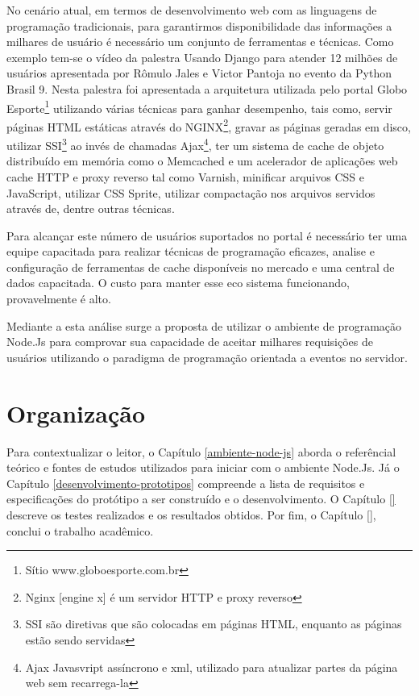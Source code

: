   No cenário atual, em termos de desenvolvimento web com as linguagens de programação tradicionais, 
  para garantirmos disponibilidade das informações a milhares de usuário é necessário um conjunto 
  de ferramentas e técnicas. Como exemplo tem-se o vídeo da palestra Usando Django para atender 12 milhões de usuários 
  apresentada por Rômulo Jales e Victor Pantoja no evento da Python Brasil 9.
  Nesta palestra foi apresentada a arquitetura utilizada pelo portal 
  Globo Esporte\footnote{Sítio www.globoesporte.com.br} utilizando várias técnicas 
  para ganhar desempenho, tais como, servir páginas HTML estáticas através do 
  NGINX\footnote{Nginx [engine x] é um servidor HTTP e proxy reverso}, gravar as páginas geradas em 
  disco, utilizar 
  SSI\footnote{SSI são diretivas que são colocadas em páginas HTML, enquanto as páginas estão sendo servidas} 
  ao invés de chamadas 
  Ajax\footnote{Ajax Javasvript assíncrono e xml, utilizado para atualizar partes da página web sem recarrega-la}, 
  ter um sistema de cache de objeto distribuído em memória   como o Memcached e um acelerador de aplicações web
  cache HTTP e proxy reverso tal como Varnish, minificar  arquivos CSS e JavaScript, utilizar CSS Sprite, utilizar 
  compactação nos arquivos servidos através de, dentre outras técnicas.
  
  Para alcançar este número de usuários suportados no portal é necessário ter uma equipe 
  capacitada para realizar técnicas de programação eficazes, analise e configuração de ferramentas de cache 
  disponíveis no mercado e uma central de dados capacitada. O custo para manter esse eco sistema funcionando,
  provavelmente é alto.
  
  Mediante a esta análise surge a proposta de utilizar o ambiente de programação Node.Js para comprovar sua 
  capacidade de aceitar milhares requisições de usuários utilizando o paradigma de programação orientada a eventos 
  no servidor.
  
\section{Organização}
\label{organizacao}  

  Para contextualizar o leitor, o Capítulo \ref{ambiente-node-js} aborda o referêncial teórico e fontes de estudos utilizados para iniciar com o ambiente 
  Node.Js. Já o Capítulo \ref{desenvolvimento-prototipos} compreende a lista de requisitos e especificações do protótipo a ser construído e o
  desenvolvimento. O Capítulo \ref{} descreve os testes realizados e os resultados obtidos. 
  Por fim, o Capítulo \ref{}, conclui o trabalho acadêmico.